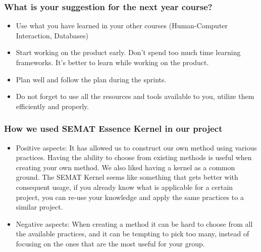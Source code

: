 \subsubsection{What is your suggestion for the next year course?}
\begin{itemize}
    \item Use what you have learned in your other courses (Human-Computer Interaction, Databases)
    \item Start working on the product early. Don't spend too much time learning frameworks. It's better to learn while working on the product.
    \item Plan well and follow the plan during the sprints.
    \item Do not forget to use all the resources and tools available to you, utilize them efficiently and properly.
\end{itemize}

\subsubsection{How we used SEMAT Essence Kernel in our project}
\begin{itemize}
    \item Positive aspects: It has allowed us to construct our own method using various practices. Having the ability to choose from existing methods is useful when creating your own method. We also liked having a kernel as a common ground.
    The SEMAT Kernel seems like something that gets better with consequent usage, if you already know what is applicable for a certain project, you can re-use your knowledge and apply the same practices to a similar project.
    \item Negative aspects: When creating a method it can be hard to choose from all the available practices, and it can be tempting to pick too many, instead of focusing on the ones that are the most useful for your group.
\end{itemize}